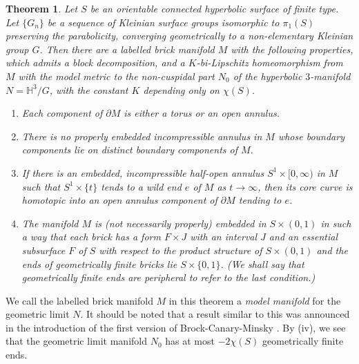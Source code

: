 \documentclass{amsart}
\newtheorem{mtheorem}{Theorem}
\theoremstyle{definition}
\numberwithin{figure}{section}
\numberwithin{equation}{section}
\newcommand{\blackboard}[1]{\ensuremath{\mathbb{#1}}}
\newcommand{\hyperbolic}{\blackboard{H}}
\def\part{\partial}
\begin{document}
\begin{mtheorem}\label{thm_a}
Let $S$ be an orientable connected hyperbolic surface of finite type.
Let $\{G_n\}$ be a sequence of Kleinian surface groups isomorphic to $\pi_1(S)$ preserving the parabolicity, converging geometrically 
to a non-elementary Kleinian group $G$.
Then there are a labelled brick manifold $M$  with the following properties, which admits  a block decomposition,   and  a $K$-bi-Lipschitz homeomorphism from $M$ with the model metric to the non-cuspidal part $N_0$ of the hyperbolic $3$-manifold $N=\hyperbolic^3/G$, with the constant $K$ depending only on $\chi(S)$.
\begin{enumerate}[\rm (i)]
\item
Each component of $\part M$ is either a torus or an open annulus.
\item
There is no properly embedded incompressible annulus in $M$ whose boundary components lie on distinct boundary components of $M$.
\item
If there is an embedded, incompressible half-open annulus $S^1 \times [0,\infty)$ in $M$ such that $S^1 \times \{t\}$ tends to a wild end $e$ of $M$ as $t \rightarrow \infty$, then its core curve is homotopic into an open annulus component of $\partial M$ tending to $e$.
\item The manifold $M$ is (not necessarily properly) embedded in $S \times (0,1)$ in such a way that each brick has a form $F \times J$ with an interval $J$ and an essential subsurface $F$ of $S$ with respect to the product structure of $S \times (0,1)$ and the ends of  geometrically finite bricks lie $S \times \{0,1\}$.
(We shall say that geometrically finite ends are peripheral to refer to the last condition.)
\end{enumerate}
\end{mtheorem}


We call the labelled brick manifold $M$ in this theorem a \emph{model manifold} for the geometric limit $N$. 
It should be noted that a result similar to this was announced in the introduction of the first version of Brock-Canary-Minsky \cite{bcm}.
By (iv), we see that the geometric limit manifold $N_0$ has at most $-2\chi(S)$ geometrically finite ends.
\end{document}
